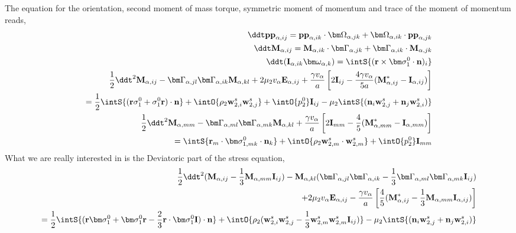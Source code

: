 The equation for the orientation, second moment of mass torque, symmetric moment of momentum and trace of the moment of momentum reads, 
\begin{align*}
    \ddt \textbf{pp}_{\alpha,ij}
    = \textbf{pp}_{\alpha,ik} \cdot \bm\Omega_{\alpha,jk}
    +  \bm\Omega_{\alpha,ik} \cdot \textbf{pp}_{\alpha,jk}\\
    \ddt \textbf{M}_{\alpha,ij}
    = \textbf{M}_{\alpha,ik} \cdot \bm\Gamma_{\alpha,jk}
    +  \bm\Gamma_{\alpha,ik} \cdot \textbf{M}_{\alpha,jk}\\
    \ddt (\textbf{I}_{\alpha,ik}\bm\omega_{\alpha,k} )
    = 
    \intS{(\textbf{r}\times\bm\sigma_1^0\cdot \textbf{n})_i} \\
    \frac{1}{2}\ddt^2 \textbf{M}_{\alpha,ij}
    -  \bm\Gamma_{\alpha,jl}\bm\Gamma_{\alpha,ik} \textbf{M}_{\alpha,kl}  
    + 2 \mu_2 v_\alpha \textbf{E}_{\alpha,ij}
    + \frac{\gamma v_\alpha }{a} \left[
    2\textbf{I}_{ij} 
    - \frac{4 \gamma v_\alpha }{5 a} (\textbf{M}_{\alpha,ij}^* - \textbf{I}_{\alpha,ij})
    \right]\\
    = 
    \frac{1}{2}\intS{(\textbf{r}\sigma_1^0 + \sigma_1^0\textbf{r})\cdot \textbf{n}} 
    + \intO{\rho_2 \textbf{w}_{2,i}^s\textbf{w}_{2,j}^s}
    + \intO{p_2^0} \textbf{I}_{ij}
    - \mu_2 \intS{(\textbf{n}_i \textbf{w}_{2,j}^s + \textbf{n}_j \textbf{w}_{2,i}^s)}\\
    \frac{1}{2}\ddt^2 \textbf{M}_{\alpha,mm}
    -  \bm\Gamma_{\alpha,ml}\bm\Gamma_{\alpha,mk} \textbf{M}_{\alpha,kl}  
    + \frac{\gamma v_\alpha }{a} \left[
    2\textbf{I}_{mm} 
    - \frac{4 }{5 } (\textbf{M}_{\alpha,mm}^* - \textbf{I}_{\alpha,mm})
    \right]\\
    = 
    \intS{\textbf{r}_m\cdot\bm\sigma_{1,mk}^0\cdot \textbf{n}_k} 
    + \intO{\rho_2 \textbf{w}_{2,m}^s\cdot \textbf{w}_{2,m}^s}
    + \intO{p_2^0} \textbf{I}_{mm}
\end{align*}
What we are really interested in is the Deviatoric part of the stress equation, 
\begin{align*}
    \frac{1}{2}\ddt^2 (\textbf{M}_{\alpha,ij} - \frac{1}{3}\textbf{M}_{\alpha,mm} \textbf{I}_{ij})
    -   \textbf{M}_{\alpha,kl} 
    (\bm\Gamma_{\alpha,jl}\bm\Gamma_{\alpha,ik}  
    - \frac{1}{3}
    \bm\Gamma_{\alpha,ml}\bm\Gamma_{\alpha,mk}  
    \textbf{I}_{ij}
    )\\
    + 2 \mu_2 v_\alpha \textbf{E}_{\alpha,ij}
    - \frac{\gamma v_\alpha }{a} \left[
    \frac{4  }{5} (\textbf{M}_{\alpha,ij}^* - \frac{1}{3} \textbf{M}_{\alpha,mm}\textbf{I}_{\alpha,ij})
    \right]\\
    = 
    \frac{1}{2}\intS{(\textbf{r}\bm\sigma_1^0 + \bm\sigma_1^0\textbf{r} - \frac{2}{3}\textbf{r}\cdot \bm\sigma_1^0 \textbf{I})\cdot \textbf{n}} 
    + \intO{\rho_2 (\textbf{w}_{2,i}^s\textbf{w}_{2,j}^s - \frac{1}{3}\textbf{w}_{2,m}^s\textbf{w}_{2,m}^s \textbf{I}_{ij}) }
    - \mu_2 \intS{(\textbf{n}_i \textbf{w}_{2,j}^s + \textbf{n}_j \textbf{w}_{2,i}^s)}\\
\end{align*}

